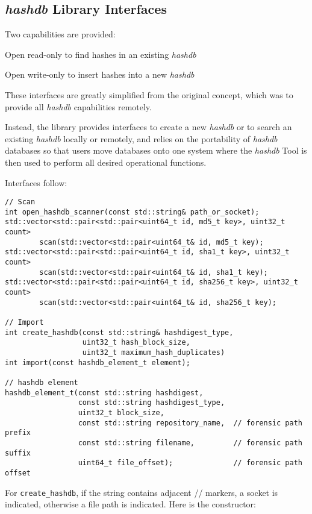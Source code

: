 \documentclass[12pt,twoside]{article}
\newcommand{\hdb}{\emph{hashdb}\xspace}
\begin{document}
\subsection{\hdb Library Interfaces}
Two capabilities are provided:
\begin{compactitem}
\item Open read-only to find hashes in an existing \hdb
\item Open write-only to insert hashes into a new \hdb
\end{compactitem}

These interfaces are greatly simplified from the original concept,
which was to provide all \hdb capabilities remotely.

Instead, the library provides interfaces to create a new \hdb
or to search an existing \hdb locally or remotely,
and relies on the portability of \hdb databases
so that users move databases onto one system
where the \hdb Tool is then used
to perform all desired operational functions.

Interfaces follow:

\begin{small}
\begin{verbatim}
// Scan
int open_hashdb_scanner(const std::string& path_or_socket);
std::vector<std::pair<std::pair<uint64_t id, md5_t key>, uint32_t count>
        scan(std::vector<std::pair<uint64_t& id, md5_t key);
std::vector<std::pair<std::pair<uint64_t id, sha1_t key>, uint32_t count>
        scan(std::vector<std::pair<uint64_t& id, sha1_t key);
std::vector<std::pair<std::pair<uint64_t id, sha256_t key>, uint32_t count>
        scan(std::vector<std::pair<uint64_t& id, sha256_t key);

// Import
int create_hashdb(const std::string& hashdigest_type,
                  uint32_t hash_block_size,
                  uint32_t maximum_hash_duplicates)
int import(const hashdb_element_t element);

// hashdb element
hashdb_element_t(const std::string hashdigest,
                 const std::string hashdigest_type,
                 uint32_t block_size,
                 const std::string repository_name,  // forensic path prefix
                 const std::string filename,         // forensic path suffix
                 uint64_t file_offset);              // forensic path offset
\end{verbatim}
\end{small}

For \texttt{create\_hashdb},
if the string contains adjacent // markers, a socket is indicated,
otherwise a file path is indicated.
Here is the constructor:
\end{document}
